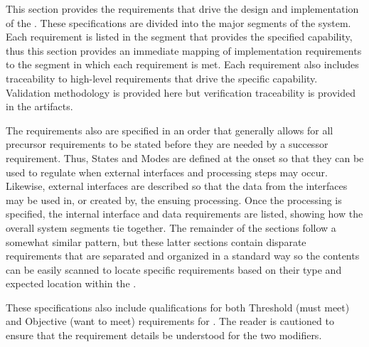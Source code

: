 
This section provides the requirements that drive the design and implementation of the \ThisSys.
These specifications are divided into the major segments of the system.
Each requirement is listed in the segment that provides the specified capability, thus this section provides an immediate mapping of implementation  requirements to the segment in which each requirement is met.
Each requirement also includes traceability to high-level requirements that drive the specific capability.
Validation methodology is provided here but verification traceability is provided in the \STS artifacts.


The requirements also are specified in an order that generally allows for all precursor requirements to be stated before they are needed by a successor requirement.
Thus, States and Modes are defined at the onset so that they can be used to regulate when external interfaces and processing steps may occur.
Likewise, external interfaces are described so that the data from the interfaces may be used in, or created by, the ensuing processing.
Once the processing is specified, the internal interface and data requirements are listed, showing how the overall system segments tie together.
The remainder of the sections follow a somewhat similar pattern, but these latter sections contain disparate requirements that are separated and organized in a standard way so the contents can be easily scanned to locate specific requirements based on their type and expected location within the \SSS.

These specifications also include qualifications for both Threshold (must meet) and Objective (want to meet) requirements for \ThisSys.
The reader is cautioned to ensure that the requirement details be understood for the two modifiers.
